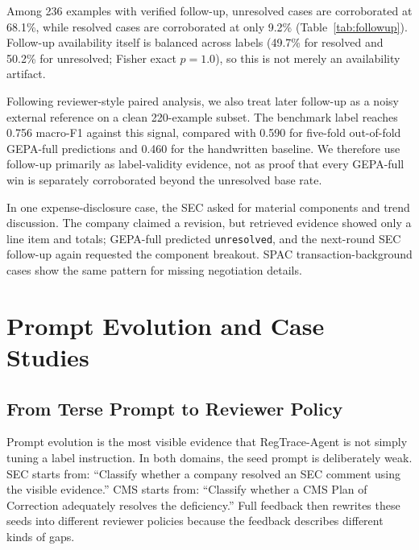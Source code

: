 \documentclass[11pt]{article}
\newcommand{\framework}{RegTrace-Agent}
\begin{document}
Among 236 examples with verified follow-up, unresolved cases are corroborated at 68.1\%, while resolved cases are corroborated at only 9.2\% (Table~\ref{tab:followup}). Follow-up availability itself is balanced across labels (49.7\% for resolved and 50.2\% for unresolved; Fisher exact $p=1.0$), so this is not merely an availability artifact.

Following reviewer-style paired analysis, we also treat later follow-up as a noisy external reference on a clean 220-example subset. The benchmark label reaches 0.756 macro-F1 against this signal, compared with 0.590 for five-fold out-of-fold GEPA-full predictions and 0.460 for the handwritten baseline. We therefore use follow-up primarily as label-validity evidence, not as proof that every GEPA-full win is separately corroborated beyond the unresolved base rate.

In one expense-disclosure case, the SEC asked for material components and trend discussion. The company claimed a revision, but retrieved evidence showed only a line item and totals; GEPA-full predicted \texttt{unresolved}, and the next-round SEC follow-up again requested the component breakout. SPAC transaction-background cases show the same pattern for missing negotiation details.

\section{Prompt Evolution and Case Studies}
\label{sec:cases}

\subsection{From Terse Prompt to Reviewer Policy}

Prompt evolution is the most visible evidence that \framework{} is not simply tuning a label instruction. In both domains, the seed prompt is deliberately weak. SEC starts from: ``Classify whether a company resolved an SEC comment using the visible evidence.'' CMS starts from: ``Classify whether a CMS Plan of Correction adequately resolves the deficiency.'' Full feedback then rewrites these seeds into different reviewer policies because the feedback describes different kinds of gaps.
\end{document}
